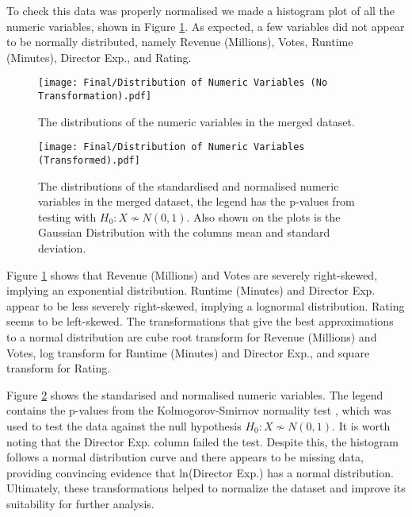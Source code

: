     \begin{multicols}{2}
        To check this data was properly normalised we made a histogram plot of all the
            numeric variables, shown in Figure \ref{fig-distribution-of-numeric-variable}.
        As expected, a few variables did not appear to be normally distributed, namely
            Revenue (Millions), Votes, Runtime (Minutes), Director Exp., and Rating.
        \begin{figure}[H]
            \centering
            \texttt{[image: Final/Distribution of Numeric Variables (No Transformation).pdf]}
            \caption{The distributions of the numeric variables in the merged dataset.}\label{fig-distribution-of-numeric-variable}
        \end{figure}
        \begin{figure}[H]
            \centering
            \texttt{[image: Final/Distribution of Numeric Variables (Transformed).pdf]}
            \caption{The distributions of the standardised and normalised numeric variables
                in the merged dataset, the legend has the p-values from testing with
                $H_{0}: X \not\sim N(0,1)$.
                Also shown on the plots is the Gaussian Distribution with the columns mean and
                    standard deviation.
            }\label{fig-transformed-distribution-of-numeric-variable}
        \end{figure}
        Figure \ref*{fig-distribution-of-numeric-variable} shows that Revenue
            (Millions) and Votes are severely right-skewed, implying an exponential
            distribution.
        Runtime (Minutes) and Director Exp.
        appear to be less severely right-skewed,
        implying a lognormal distribution.
        Rating seems to be left-skewed.
        The transformations that give the best approximations to a normal distribution
            are cube root transform for Revenue (Millions) and Votes, log transform for
            Runtime (Minutes) and Director Exp., and square transform for Rating.

        Figure \ref*{fig-transformed-distribution-of-numeric-variable} shows the
            standarised and normalised numeric variables.
        The legend contains the p-values from the Kolmogorov-Smirnov normality test
            \cite*{KStest}, which was used to test the data against the null hypothesis
            $H_{0}: X \not\sim N(0,1)$.
        It is worth noting that the Director Exp.
        column failed the test.
        Despite this, the histogram follows a normal distribution curve and there
            appears to be missing data, providing convincing evidence that ln(Director
            Exp.)
        has a normal distribution.
        Ultimately, these transformations helped to normalize the dataset and improve
            its suitability for further analysis.


\end{multicols}
